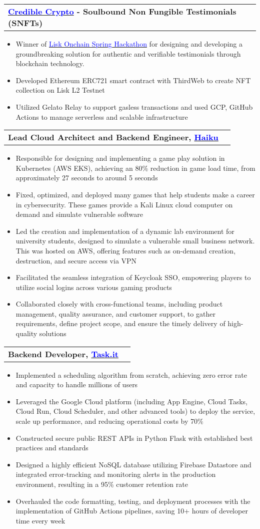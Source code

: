 \documentclass[letterpaper,11pt]{article}
\makeatletter
\newcommand{\resumeItem}[1]{
  \item\small{
    {#1 \vspace{-2pt}}
  }
}
\newcommand{\resumeProjectHeading}[2]{
    \vspace{-2pt}\item
    \begin{tabular*}{0.97\textwidth}{l@{\extracolsep{\fill}}r}
      \small#1 & #2 \\
    \end{tabular*}\vspace{-7pt}
}
\newcommand{\resumeItemListStart}{\begin{itemize}}
\newcommand{\resumeItemListEnd}{\end{itemize}\vspace{-5pt}}
\makeatother
\begin{document}
\resumeProjectHeading
{\textbf{{\href{https://devpost.com/software/credible-crypto}{\textcolor{blue}{Credible Crypto}}} - Soulbound Non Fungible Testimonials (SNFTs)} \emph}{}
\resumeItemListStart
\resumeItem{Winner of {\href{https://lisk.devpost.com/}{\textcolor{blue}{Lisk Onchain Spring Hackathon}}} for designing and developing a groundbreaking solution for authentic and verifiable testimonials through blockchain technology.}
\resumeItem{Developed Ethereum ERC721 smart contract with ThirdWeb to create NFT collection on Lisk L2 Testnet}
\resumeItem{Utilized Gelato Relay to support gasless transactions and used GCP, GitHub Actions to manage serverless and scalable infrastructure}
\resumeItemListEnd

\resumeProjectHeading
{\textbf{Lead Cloud Architect and Backend Engineer, {\href{https://haikuinc.io/}{\textcolor{blue}{Haiku}}}} \emph}{}
\resumeItemListStart
\resumeItem{Responsible for designing and implementing a game play solution in Kubernetes (AWS EKS), achieving an 80\% reduction in game load time, from approximately 27 seconds to around 5 seconds}
\resumeItem{Fixed, optimized, and deployed many games that help students make a career in cybersecurity. These games provide a Kali Linux cloud computer on demand and simulate vulnerable software}
\resumeItem{Led the creation and implementation of a dynamic lab environment for university students, designed to simulate a vulnerable small business network. This was hosted on AWS, offering features such as on-demand creation, destruction, and secure access via VPN}
\resumeItem{Facilitated the seamless integration of Keycloak SSO, empowering players to utilize social logins across various gaming products}
\resumeItem{Collaborated closely with cross-functional teams, including product management, quality assurance, and customer support, to gather requirements, define project scope, and ensure the timely delivery of high-quality solutions}
\resumeItemListEnd

\resumeProjectHeading
{\textbf{Backend Developer, {\href{https://www.task.it/}{\textcolor{blue}{Task.it}}}} \emph}{}
\resumeItemListStart
\resumeItem{Implemented a scheduling algorithm from scratch, achieving zero error rate and capacity to handle millions of users} %
\resumeItem{Leveraged the Google Cloud platform (including App Engine, Cloud Tasks, Cloud Run, Cloud Scheduler, and other advanced tools) to deploy the service, scale up performance, and reducing operational costs by 70\%} %
\resumeItem {Constructed secure public REST APIs in Python Flask with established best practices and standards} %
\resumeItem{Designed a highly efficient NoSQL database utilizing Firebase Datastore and integrated error-tracking and monitoring alerts in the production environment, resulting in a 95\% customer retention rate} %
\resumeItem{Overhauled the code formatting, testing, and deployment processes with the implementation of GitHub Actions pipelines, saving 10+ hours of developer time every week} %
\resumeItemListEnd
\end{document}
